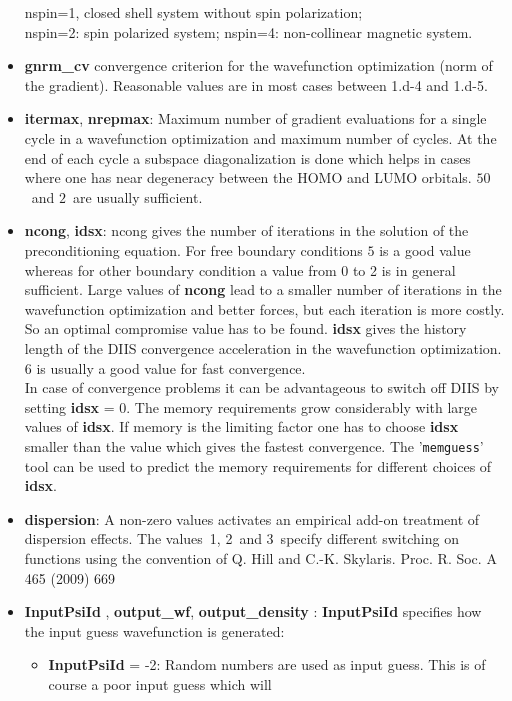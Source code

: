 \documentclass[a4paper,11pt]{report}
\begin{document}
\begin{itemize}
      nspin=1, closed shell system without spin polarization;\hfill\\
      nspin=2: spin polarized system; 
      nspin=4: non-collinear magnetic system.
\item {\bf gnrm\_cv} convergence criterion for the wavefunction optimization (norm of the gradient).
      Reasonable values are in most cases between 1.d-4 and 1.d-5.
\item {\bf itermax}, {\bf nrepmax}: Maximum number of gradient evaluations for a single cycle in a wavefunction optimization 
      and maximum number of cycles. At the end of each cycle a subspace diagonalization is done which helps 
in cases where one has near degeneracy between the HOMO and LUMO orbitals. $50$~and $2$~are usually sufficient.
\item {\bf ncong}, {\bf idsx}: ncong gives the number of iterations in the solution of the preconditioning equation.
      For free boundary conditions $5$ is a good value whereas for other  boundary condition a value from 0 to 2 is in general sufficient. 
      Large values of {\bf ncong} lead to a smaller number of iterations in 
      the wavefunction optimization and better forces, but each iteration is more costly. 
      So an optimal compromise value has to be found.
      {\bf idsx} gives the history length of the DIIS convergence acceleration in the wavefunction optimization.
      6 is usually a good value for fast convergence.\\
      In case of convergence problems it can be advantageous 
      to switch off DIIS by setting {\bf idsx} = 0. The memory requirements grow considerably with large values of 
      {\bf idsx}. If memory is the limiting factor one has to choose {\bf idsx} smaller than the value which gives 
      the fastest convergence. The '\texttt{memguess}' tool can be used to predict the memory requirements for different choices 
      of  {\bf idsx}.
\item {\bf dispersion}:  A non-zero values activates an  empirical add-on treatment of dispersion effects.
      The values~1, 2~and 3~specify different switching on functions using the convention of 
      Q. Hill and C.-K. Skylaris.  Proc. R. Soc. A 465  (2009) 669
\item {\bf InputPsiId }, {\bf  output\_wf},  {\bf output\_density }: 
      {\bf InputPsiId } specifies how the input guess wavefunction is generated:
      \begin{itemize}
      \item {\bf InputPsiId } = -2: Random numbers are used as input guess. This is of course a poor input guess which will 

\end{itemize}
\end{itemize}
\end{document}

